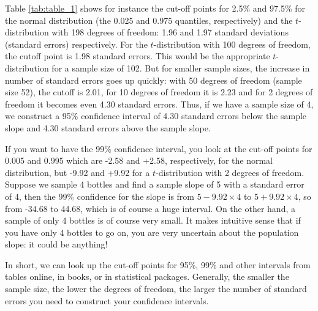 \documentclass[]{report}\usepackage[]{graphicx}\usepackage[]{color}
\begin{document}
Table \ref{tab:table_1} shows for instance the cut-off points for 2.5\% and 97.5\% for the normal distribution (the 0.025 and 0.975 quantiles, respectively) and the $t$-distribution with 198 degrees of freedom: 1.96 and 1.97 standard deviations (standard errors) respectively. For the $t$-distribution with 100 degrees of freedom, the cutoff point is 1.98 standard errors. This would be the appropriate $t$-distribution for a sample size of 102. But for smaller sample sizes, the increase in number of standard errors goes up quickly: with 50 degrees of freedom (sample size 52), the cutoff is 2.01, for 10 degrees of freedom it is 2.23 and for 2 degrees of freedom it becomes even 4.30 standard errors. Thus, if we have a sample size of 4, we construct a 95\% confidence interval of 4.30 standard errors below the sample slope and 4.30 standard errors above the sample slope.

If you want to have the 99\% confidence interval, you look at the cut-off points for 0.005 and 0.995 which are -2.58 and +2.58, respectively, for the normal distribution, but -9.92 and +9.92 for a $t$-distribution with 2 degrees of freedom. Suppose we sample 4 bottles and find a sample slope of 5 with a standard error of 4, then the 99\% confidence for the slope is from $5-9.92\times 4$ to $5+9.92\times 4$, so from -34.68 to 44.68, which is of course a huge interval. On the other hand, a sample of only 4 bottles is of course very small. It makes intuitive sense that if you have only 4 bottles to go on, you are very uncertain about the population slope: it could be anything!

In short, we can look up the cut-off points for 95\%, 99\% and other intervals from tables online, in books, or in statistical packages. Generally, the smaller the sample size, the lower the degrees of freedom, the larger the number of standard errors you need to construct your confidence intervals.
\end{document}
